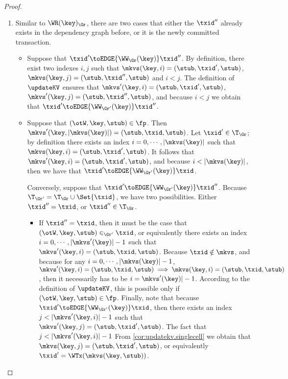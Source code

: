 \begin{proof}
\begin{enumerate}
\item 
Similar to \( \WR(\key)_{\Gr} \), there are two cases that either the \( \txid'' \) already exists in the dependency graph before,
or it is the newly committed transaction.
\begin{itemize}
\item Suppose that $\txid' \toEDGE{\WW_{\Gr}(\key)} \txid''$. 
By definition, there exist two indexes $i, j$ such that 
$\mkvs(\key, i) = (\stub, \txid', \stub)$, $\mkvs(\key, j) = (\stub, \txid'', \stub)$ 
and $i < j$. The definition of $\updateKV$ ensures that 
$\mkvs'(\key, i) = (\stub, \txid', \stub)$, $\mkvs'(\key, j) = (\stub, \txid'', \stub)$, 
and because $i < j$ we obtain that $\txid' \toEDGE{\WW_{\Gr'}(\key)} \txid''$. 

\item Suppose that $(\otW, \key, \stub) \in \fp$. Then $\mkvs'(\key, \lvert \mkvs(\key) \rvert) = (\stub, \txid, \stub)$.
Let $\txid' \in \T_{\Gr}$; by definition there exists an index $i = 0,\cdots, \lvert \mkvs(\key) \rvert$ 
such that $\mkvs(\key, i) = (\stub, \txid', \stub)$. It follows that $\mkvs'(\key, i) = (\stub, \txid', \stub)$, and 
because $i < \lvert \mkvs(\key) \rvert$, then we have that $\txid' \toEDGE{\WW_{\Gr'}(\key)} \txid$. 

Conversely, suppose that $\txid' \toEDGE{\WW_{\Gr'}(\key)} \txid''$. Because 
$\T_{\Gr'} = \T_{\Gr} \cup \Set{ \txid }$, we have two possibilities. Either $\txid'' = \txid$, 
or $\txid'' \in \T_{\Gr}$. 

\begin{itemize}
\item If $\txid'' = \txid$, then it must be the case that $(\otW, \key, \stub) \in_{\Gr'} \txid$, 
or equivalently there exists an index $i=0,\cdots, \lvert \mkvs'(\key) \rvert -1 $ such that 
$\mkvs'(\key, i) = (\stub, \txid, \stub)$. Because $\txid \notin \mkvs$, and because for any 
$i = 0, \cdots, \lvert \mkvs(\key) \rvert - 1$, $\mkvs'(\key, i) = (\stub, \txid, \stub) \implies 
\mkvs(\key, i) = (\stub, \txid, \stub)$, then it necessarily has to be $i = \mkvs'(\key) \rvert - 1$. 
According to the definition of $\updateKV$, this is possible only if $(\otW,\key, \stub) \in \fp$. 
Finally, note that because $\txid' \toEDGE{\WW_{\Gr'}(\key)} \txid$, then 
there exists an index $j < \lvert \mkvs'(\key, i) \rvert - 1$ such that 
$\mkvs'(\key, j) = (\stub, \txid' ,\stub)$. The fact that $j < \lvert \mkvs'(\key, i) \rvert - 1$ 
From \cref{cor:updatekv.singlecell} we obtain that $\mkvs(\key, j) = (\stub, \txid', \stub)$, 
or equivalently $\txid' = \WTx(\mkvs(\key, \stub))$. 


\end{itemize}
\end{itemize}
\end{enumerate}
\end{proof}
